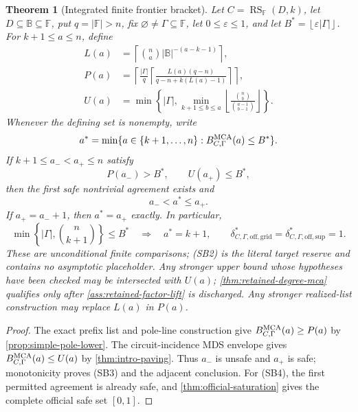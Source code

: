 \documentclass[11pt,a4paper]{amsart}
\numberwithin{equation}{section}
\newtheorem{theorem}{Theorem}[section]
\theoremstyle{remark}
\DeclareMathOperator{\RS}{RS}
\newcommand{\F}{\mathbb F}
\newcommand{\B}{\mathbb B}
\newcommand{\eps}{\varepsilon}
\newcommand{\abs}[1]{\lvert #1\rvert}
\newcommand{\floor}[1]{\left\lfloor #1\right\rfloor}
\newcommand{\ceil}[1]{\left\lceil #1\right\rceil}
\begin{document}
\begin{theorem}[Integrated finite frontier bracket]
\label{thm:unconditional-support-envelope-bracket}
Let \(C=\RS_\F(D,k)\), let \(D\subseteq\B\subseteq\F\), put
\(q=\abs\F>n\), fix \(\varnothing\ne\Gamma\subseteq\F\), let
\(0\le\eps\le1\), and let
\(B^*=\floor{\eps\abs\Gamma}\).  For \(k+1\le a\le n\), define
\[
 \begin{split}
 L(a)&=\ceil{\binom na\abs\B^{-(a-k-1)}},\\
 P(a)&=\left\lceil\frac{\abs\Gamma}{q}
       \left\lceil\frac{L(a)(q-n)}
       {q-n+k(L(a)-1)}\right\rceil\right\rceil,\\
 U(a)&=\min\left\{\abs\Gamma,
       \min_{k+1\le b\le a}
       \floor{\frac{\binom nb}{\binom{a-1}{b-1}}}\right\}.
 \end{split}                                       \tag{SB1}
\]
Whenever the defining set is nonempty, write
\[
 a^*=\min\{a\in\{k+1,\ldots,n\}:
               B_{C,\Gamma}^{\rm MCA}(a)\le B^*\}.
\]
If \(k+1\le a_-<a_+\le n\) satisfy
\[
                         P(a_-)>B^*,\qquad U(a_+)\le B^*, \tag{SB2}
\]
then the first safe nontrivial agreement exists and
\[
                         a_-<a^*\le a_+.            \tag{SB3}
\]
If \(a_+=a_-+1\), then \(a^*=a_+\) exactly.  In particular,
\[
 \min\left\{\abs\Gamma,\binom n{k+1}\right\}\le B^*
 \quad\Longrightarrow\quad
 a^*=k+1,\qquad
 \delta_{C,\Gamma,\mathrm{off,grid}}^*
 =\delta_{C,\Gamma,\mathrm{off,sup}}^*=1.         \tag{SB4}
\]
These are unconditional finite comparisons; \textup{(SB2)} is the
literal target reserve and contains no asymptotic placeholder.  Any
stronger upper bound whose hypotheses have been checked may be intersected
with \(U(a)\); \cref{thm:retained-degree-mca} qualifies only after
\cref{ass:retained-factor-lift} is discharged.  Any
stronger realized-list construction may replace \(L(a)\) in \(P(a)\).
\end{theorem}

\begin{proof}
The exact prefix list and pole-line construction give
\(B_{C,\Gamma}^{\rm MCA}(a)\ge P(a)\) by
\cref{prop:simple-pole-lower}.  The circuit-incidence MDS envelope gives
\(B_{C,\Gamma}^{\rm MCA}(a)\le U(a)\) by
\cref{thm:intro-paving}.  Thus \(a_-\) is unsafe and \(a_+\) is
safe; monotonicity proves \textup{(SB3)} and the adjacent conclusion.
For \textup{(SB4)}, the first permitted agreement is already safe, and
\cref{thm:official-saturation} gives the complete official safe set
\([0,1]\).
\end{proof}
\end{document}
